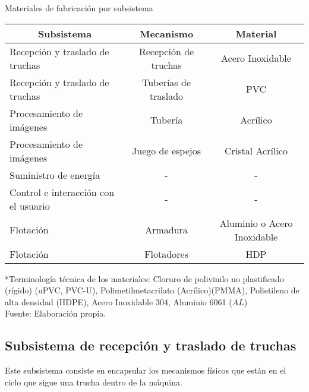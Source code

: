 \begin{mytable}[H]
	\centering
	\caption{Materiales de fabricación por subsistema}
	\label{tab:materiales de fabricacion por subsistema}
	\begin{tabular}{|l|c|c|}
		\hline
		\multicolumn{1}{|c|}{\textbf{Subsistema}} & \multicolumn{1}{c|}{\textbf{Mecanismo}} & \textbf{Material} \\ \hline
		Recepción y traslado de truchas      & Recepción de truchas   & Acero Inoxidable            \\ \hline
		Recepción y traslado de truchas      & Tuberías de traslado   & PVC                         \\ \hline
		Procesamiento de imágenes            & Tubería                & Acrílico                    \\ \hline
		Procesamiento de imágenes            & Juego de espejos       & Cristal Acrílico    \\ \hline
		Suministro de energía                & \multicolumn{1}{c|}{-} & -                           \\ \hline
		Control e interacción con el usuario & \multicolumn{1}{c|}{-} & -                           \\ \hline
		Flotación                            & Armadura               & Aluminio o Acero Inoxidable \\ \hline
		Flotación                            & Flotadores             & HDP                         \\ \hline
	\end{tabular}
	\begin{flushleft}
	*Terminología técnica de los materiales: Cloruro de polivinilo no plastificado (rígido) (uPVC, PVC-U), Polimetilmetacrilato (Acrílico)(PMMA), Polietileno de alta densidad (HDPE), Acero Inoxidable 304, Aluminio 6061 ($AL$)\\	
	Fuente: Elaboración propia. 
	\end{flushleft}
\end{mytable}



\subsection{Subsistema de recepción y traslado de truchas}
\label{ssec:subsistema de recepcion y traslado de truchas}

Este subsistema consiste en encapsular los mecanismos físicos que están en el ciclo que sigue una trucha dentro de la máquina. 



